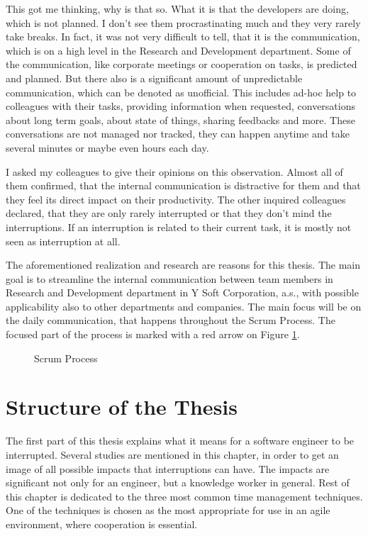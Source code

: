 \documentclass[11pt,singleside]{myfithesis2}
\newcommand{\pict}[4]{
	\begin{figure}[h!]
  		\vspace{-7px}
  		\centerline{\fcolorbox{darkgray}{palegray}{\texttt{[image: \#2]}}}
  		\caption{#1}
  		\label{#4}
	\end{figure}
}
\begin{document}
This got me thinking, why is that so. What it is that the developers are doing, which is not planned. I don't see them procrastinating much and they very rarely take breaks. In fact, it was not very difficult to tell, that it is the communication, which is on a high level in the Research and Development department. Some of the communication, like corporate meetings or cooperation on tasks, is predicted and planned. But there also is a significant amount of unpredictable communication, which can be denoted as unofficial. This includes ad-hoc help to colleagues with their tasks, providing information when requested, conversations about long term goals, about state of things, sharing feedbacks and more. These conversations are not managed nor tracked, they can happen anytime and take several minutes or maybe even hours each day.

I asked my colleagues to give their opinions on this observation. Almost all of them confirmed, that the internal communication is distractive for them and that they feel its direct impact on their productivity. The other inquired colleagues declared, that they are only rarely interrupted or that they don't mind the interruptions. If an interruption is related to their current task, it is mostly not seen as interruption at all.

The aforementioned realization and research are reasons for this thesis. The main goal is to streamline the internal communication between team members in Research and Development department in Y Soft Corporation, a.s., with possible applicability also to other departments and companies. The main focus will be on the daily communication, that happens throughout the Scrum Process. The focused part of the process is marked with a red arrow on Figure \ref{pic:scrumProcess}.

\pict{Scrum Process \cite{scrumProcess}}{data/Scrum_process.png}{width=0.8\textwidth}{pic:scrumProcess}


	\section{Structure of the Thesis}
The first part of this thesis explains what it means for a software engineer to be interrupted. Several studies are mentioned in this chapter, in order to get an image of all possible impacts that interruptions can have. The impacts are significant not only for an engineer, but a knowledge worker in general. Rest of this chapter is dedicated to the three most common time management techniques. One of the techniques is chosen as the most appropriate for use in an agile environment, where cooperation is essential.
\end{document}
